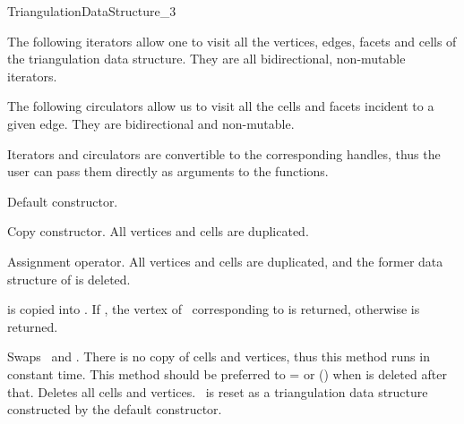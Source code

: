 \begin{ccRefConcept}{TriangulationDataStructure_3}
\ccGlue
{} 

The following iterators allow one to visit all the vertices, edges, facets
and cells of the triangulation data structure. They are all
bidirectional, non-mutable iterators.

\ccGlue
{}
\ccGlue
{}
\ccGlue
{}

The following circulators allow us to visit all the cells and facets
incident to a given edge. They are bidirectional and non-mutable.

\ccGlue
{}

Iterators and circulators are convertible to the corresponding handles, thus
the user can pass them directly as arguments to the functions.

\ccCreation
{}  %
\ccThreeToTwo

{Default constructor.}

{Copy constructor. All vertices and cells are duplicated.}

{Assignment operator. All vertices and cells are duplicated, and the former
data structure of  is deleted.}


{ is copied into \ccVar. If ,
the vertex of \ccVar\ corresponding to  is returned,
otherwise  is returned.
}

{Swaps \ccVar\ and . There is no copy of cells and vertices,
thus this method runs in constant time. This method should be preferred to
\ccVar= or \ccVar() when  is deleted after
that.}
\ccGlue
{}
{Deletes all cells and vertices. \ccVar\ is reset as a triangulation
data structure constructed by the default constructor.}


\end{ccRefConcept}
